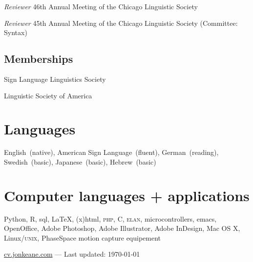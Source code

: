 \documentclass[10pt, letterpaper]{article}
\newcommand{\years}[1]{\marginpar{\scriptsize #1}}
\begin{document}
\-\years{2010}\textit{Reviewer} 46th Annual Meeting of the Chicago Linguistic Society

\-\years{2009}\textit{Reviewer} 45th Annual Meeting of the Chicago Linguistic Society (Committee: Syntax)

\subsection*{Memberships}
\label{sec:memberships}
\-\years{2013--}Sign Language Linguistics Society

\-\years{2008--}Linguistic Society of America

\section*{Languages}
\label{sec:languages}
English~(native), American Sign Language~(fluent), German~(reading), Swedish~(basic), Japanese~(basic), Hebrew~(basic)

\section*{Computer languages + applications}
\label{sec:computer}
Python, R, {\sc sql}, \LaTeX, {\sc (x)html}, \textsc{php}, C, \textsc{elan}, microcontrollers, emacs, OpenOffice, Adobe Photoshop, Adobe Illustrator, Adobe InDesign, Mac OS X, Linux/\textsc{unix}, PhaseSpace motion capture equipement

\vfill{}
\hrulefill
\begin{center}
{\footnotesize \href{http://cv.jonkeane.com}{cv.jonkeane.com} — Last updated: \isodate\today}
\end{center}
\end{document}
